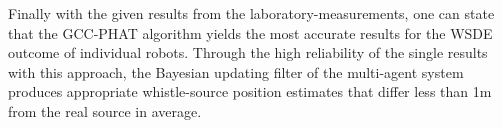 Finally with the given results from the laboratory-measurements, one can state that
the \acf{GCC-PHAT} algorithm yields the most
accurate results for the \acf{WSDE} outcome of individual robots.
Through the high reliability of the single results with this approach, the Bayesian updating
filter of the multi-agent system produces appropriate whistle-source position estimates that
differ less than 1\si{\meter} from the real source in average.


